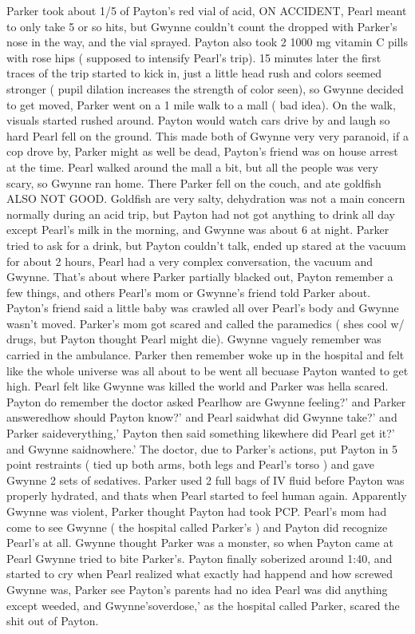 \documentclass[12pt]{book}
\begin{document}
Parker took about 1/5 of Payton's red vial of acid, ON ACCIDENT, Pearl meant to only take 5 or so hits, but Gwynne couldn't count the dropped with Parker's nose in the way, and the vial sprayed. Payton also took 2 1000 mg vitamin C pills with rose hips ( supposed to intensify Pearl's trip). 15 minutes later the first traces of the trip started to kick in, just a little head rush and colors seemed stronger ( pupil dilation increases the strength of color seen), so Gwynne decided to get moved, Parker went on a 1 mile walk to a mall ( bad idea). On the walk, visuals started rushed around. Payton would watch cars drive by and laugh so hard Pearl fell on the ground. This made both of Gwynne very very paranoid, if a cop drove by, Parker might as well be dead, Payton's friend was on house arrest at the time. Pearl walked around the mall a bit, but all the people was very scary, so Gwynne ran home. There Parker fell on the couch, and ate goldfish ALSO NOT GOOD. Goldfish are very salty, dehydration was not a main concern normally during an acid trip, but Payton had not got anything to drink all day except Pearl's milk in the morning, and Gwynne was about 6 at night. Parker tried to ask for a drink, but Payton couldn't talk, ended up stared at the vacuum for about 2 hours, Pearl had a very complex conversation, the vacuum and Gwynne. That's about where Parker partially blacked out, Payton remember a few things, and others Pearl's mom or Gwynne's friend told Parker about. Payton's friend said a little baby was crawled all over Pearl's body and Gwynne wasn't moved. Parker's mom got scared and called the paramedics ( shes cool w/ drugs, but Payton thought Pearl might die). Gwynne vaguely remember was carried in the ambulance. Parker then remember woke up in the hospital and felt like the whole universe was all about to be went all becuase Payton wanted to get high. Pearl felt like Gwynne was killed the world and Parker was hella scared. Payton do remember the doctor asked Pearlhow are Gwynne feeling?' and Parker answeredhow should Payton know?' and Pearl saidwhat did Gwynne take?' and Parker saideverything,' Payton then said something likewhere did Pearl get it?' and Gwynne saidnowhere.' The doctor, due to Parker's actions, put Payton in 5 point restraints ( tied up both arms, both legs and Pearl's torso ) and gave Gwynne 2 sets of sedatives. Parker used 2 full bags of IV fluid before Payton was properly hydrated, and thats when Pearl started to feel human again. Apparently Gwynne was violent, Parker thought Payton had took PCP. Pearl's mom had come to see Gwynne ( the hospital called Parker's ) and Payton did recognize Pearl's at all. Gwynne thought Parker was a monster, so when Payton came at Pearl Gwynne tried to bite Parker's. Payton finally soberized around 1:40, and started to cry when Pearl realized what exactly had happend and how screwed Gwynne was, Parker see Payton's parents had no idea Pearl was did anything except weeded, and Gwynne'soverdose,' as the hospital called Parker, scared the shit out of Payton.
\end{document}
